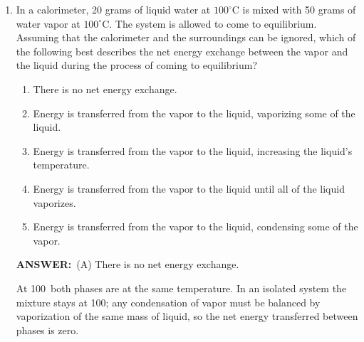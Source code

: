 \documentclass[12pt, a4paper]{article}
\makeatletter
\newcommand{\finalanswer}[1]{\textbf{ANSWER:}~#1}
\newif\if@categoryprinted
\newcommand{\category}[1]{\if@categoryprinted\relax\else\textit{\textcolor{gray}{Category: #1}}\global\@categoryprintedtrue\fi}
\makeatother
\begin{document}
\begin{CJK*}{UTF8}{gbsn}
\begin{enumerate}[itemsep=1.0em, topsep=0.6em]
\category{Simple Machines \& Statics}
\begin{answerbox}
\finalanswer{(D) 4}
\end{answerbox}
\begin{insightbox}
Ideal mechanical advantage equals the number of load-supporting rope segments: 4.
\end{insightbox}
\begin{solutionbox}

The ideal mechanical advantage equals the number of rope segments supporting the load. Here the movable block is supported by 4 segments, so $\text{IMA}=4$.
\\
\emph{Reminder:} massless, frictionless rope $\Rightarrow$ equal tension in all supporting segments.
\end{solutionbox}

\item \label{prob:6}
In a calorimeter, 20 grams of liquid water at $100^\circ$C is mixed with 50 grams of water vapor at $100^\circ$C. The system is allowed to come to equilibrium. Assuming that the calorimeter and the surroundings can be ignored, which of the following best describes the net energy exchange between the vapor and the liquid during the process of coming to equilibrium?
\begin{enumerate}[label=(\Alph*)]
    \item There is no net energy exchange.
    \item Energy is transferred from the vapor to the liquid, vaporizing some of the liquid.
    \item Energy is transferred from the vapor to the liquid, increasing the liquid’s temperature.
    \item Energy is transferred from the vapor to the liquid until all of the liquid vaporizes.
    \item Energy is transferred from the vapor to the liquid, condensing some of the vapor.
\end{enumerate}

\category{Thermodynamics \& Phase Equilibrium}
\begin{answerbox}
\finalanswer{(A) There is no net energy exchange.}
\end{answerbox}
\begin{insightbox}
At 100\textcelsius\ both phases are at the same temperature. In an isolated system the mixture stays at 100\textcelsius; any condensation of vapor must be balanced by vaporization of the same mass of liquid, so the net energy transferred between phases is zero.
\end{insightbox}
\begin{solutionbox}


\end{solutionbox}
\end{enumerate}
\end{CJK*}
\end{document}
